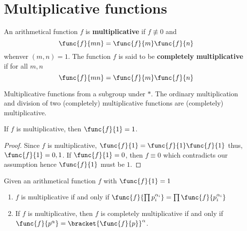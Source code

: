 \section{Multiplicative functions}
\begin{definition}
    An arithmetical function \(f\) is \textbf{multiplicative} if \(f \not\equiv 0\) and 
    \begin{equation*}
        \func{f}{mn} = \func{f}{m} \func{f}{n}
    \end{equation*}
    whenver \((m,n) = 1\). The function \(f\) is said to be \textbf{completely multiplicative} if for all \(m,n\)
    \begin{equation*}
        \func{f}{mn} = \func{f}{m} \func{f}{n}
    \end{equation*}
\end{definition}
\begin{remark}
    Multiplicative functions from a subgroup under \(\ast\). The ordinary multiplication and division of two (completely) multiplicative functions are (completely) multiplicative.
\end{remark}
\begin{proposition}
    If \(f\) is multiplicative, then \(\func{f}{1} = 1\).
\end{proposition}
\begin{proof}
    Since \(f\) is multiplicative, \(\func{f}{1} = \func{f}{1}\func{f}{1}\) thus, \(\func{f}{1} = 0,1\). If \(\func{f}{1} = 0\), then \(f \equiv 0\) which contradicts our assumption hence \(\func{f}{1}\) must be \(1\).
\end{proof}
\begin{theorem}
    Given an arithmetical function \(f\) with \(\func{f}{1} = 1\)
    \begin{enumerate}
        \item  \(f\) is multiplicative if and only if \(\func{f}{\prod p_i^{\alpha_i}} = \prod \func{f}{p_i^{\alpha_i}}\)
        \item If \(f\) is multiplicative, then \(f\) is completely multiplicative if and only if \(\func{f}{p^{\alpha}} = \bracket{\func{f}{p}}^{\alpha}\).
    \end{enumerate}
\end{theorem}

